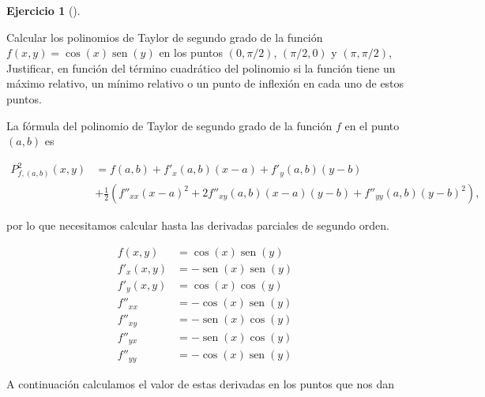 \documentclass[
  spanish,
  a4paper,
]{scrreport}
\theoremstyle{definition}
\newtheorem{exercise}{Ejercicio}[chapter]
\theoremstyle{remark}
\begin{document}
\begin{exercise}[]\protect\hypertarget{exr-2}{}\label{exr-2}

Calcular los polinomios de Taylor de segundo grado de la función
\(f(x,y)=\cos(x)\operatorname{sen}(y)\) en los puntos \((0,\pi/2)\),
\((\pi/2,0)\) y \((\pi,\pi/2)\), Justificar, en función del término
cuadrático del polinomio si la función tiene un máximo relativo, un
mínimo relativo o un punto de inflexión en cada uno de estos puntos.

\end{exercise}

\begin{tcolorbox}[enhanced jigsaw, arc=.35mm, bottomrule=.15mm, bottomtitle=1mm, breakable, colback=white, colbacktitle=quarto-callout-tip-color!10!white, colframe=quarto-callout-tip-color-frame, coltitle=black, left=2mm, leftrule=.75mm, opacityback=0, opacitybacktitle=0.6, rightrule=.15mm, title=\textcolor{quarto-callout-tip-color}{\faLightbulb}\hspace{0.5em}{Solución}, titlerule=0mm, toprule=.15mm, toptitle=1mm]

La fórmula del polinomio de Taylor de segundo grado de la función \(f\)
en el punto \((a,b)\) es

\begin{align*}
P^2_{f,(a,b)}(x,y) 
&= f(a,b) + f'_x(a,b)(x-a) + f'_y(a,b)(y-b) \\
&+ \frac{1}{2}\left(f''_{xx}(x-a)^2 + 2f''_{xy}(a,b)(x-a)(y-b) + f''_{yy}(a,b)(y-b)^2\right),
\end{align*}

por lo que necesitamos calcular hasta las derivadas parciales de segundo
orden.

\begin{align*}
f(x,y) &= \cos(x)\operatorname{sen}(y)\\
f'_x(x,y) &= -\operatorname{sen}(x)\operatorname{sen}(y) \\
f'_y(x,y) &= \cos(x)\cos(y) \\
f''_{xx} &= -\cos(x)\operatorname{sen}(y) \\
f''_{xy} &= -\operatorname{sen}(x)\cos(y) \\
f''_{yx} &= -\operatorname{sen}(x)\cos(y) \\
f''_{yy} &= -\cos(x)\operatorname{sen}(y)
\end{align*}

A continuación calculamos el valor de estas derivadas en los puntos que
nos dan


\end{tcolorbox}
\end{document}

